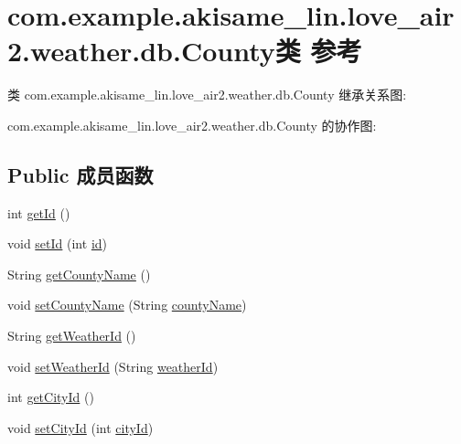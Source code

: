 \hypertarget{classcom_1_1example_1_1akisame__lin_1_1love__air2_1_1weather_1_1db_1_1_county}{}\section{com.\+example.\+akisame\+\_\+lin.\+love\+\_\+air2.\+weather.\+db.\+County类 参考}
\label{classcom_1_1example_1_1akisame__lin_1_1love__air2_1_1weather_1_1db_1_1_county}


类 com.\+example.\+akisame\+\_\+lin.\+love\+\_\+air2.\+weather.\+db.\+County 继承关系图\+:


com.\+example.\+akisame\+\_\+lin.\+love\+\_\+air2.\+weather.\+db.\+County 的协作图\+:
\subsection*{Public 成员函数}
\begin{DoxyCompactItemize}
\item 
int \mbox{\hyperlink{classcom_1_1example_1_1akisame__lin_1_1love__air2_1_1weather_1_1db_1_1_county_a3a5dbe427d3901aa5286de4df9147fb7}{get\+Id}} ()
\item 
void \mbox{\hyperlink{classcom_1_1example_1_1akisame__lin_1_1love__air2_1_1weather_1_1db_1_1_county_af07061de33945a1308ff6aa52243b244}{set\+Id}} (int \mbox{\hyperlink{classcom_1_1example_1_1akisame__lin_1_1love__air2_1_1weather_1_1db_1_1_county_a56ac4d6f64b542565100e138681c62d6}{id}})
\item 
String \mbox{\hyperlink{classcom_1_1example_1_1akisame__lin_1_1love__air2_1_1weather_1_1db_1_1_county_a6032aca0f273294dabfb63aa0c3ae18b}{get\+County\+Name}} ()
\item 
void \mbox{\hyperlink{classcom_1_1example_1_1akisame__lin_1_1love__air2_1_1weather_1_1db_1_1_county_a72c99a8667f59123abc68d021a0d991d}{set\+County\+Name}} (String \mbox{\hyperlink{classcom_1_1example_1_1akisame__lin_1_1love__air2_1_1weather_1_1db_1_1_county_abaca763825c2bc3d2c3302918902db9b}{county\+Name}})
\item 
String \mbox{\hyperlink{classcom_1_1example_1_1akisame__lin_1_1love__air2_1_1weather_1_1db_1_1_county_a7dc3f816523251642ffeb6bd0f77aa8a}{get\+Weather\+Id}} ()
\item 
void \mbox{\hyperlink{classcom_1_1example_1_1akisame__lin_1_1love__air2_1_1weather_1_1db_1_1_county_a8f7bc17f518be4d1c32794d4551547d9}{set\+Weather\+Id}} (String \mbox{\hyperlink{classcom_1_1example_1_1akisame__lin_1_1love__air2_1_1weather_1_1db_1_1_county_a11751ad0f8a6a16364a9ec74a3b7d926}{weather\+Id}})
\item 
int \mbox{\hyperlink{classcom_1_1example_1_1akisame__lin_1_1love__air2_1_1weather_1_1db_1_1_county_a6d74cfab6bc1e2b55d58b5f37b6b2903}{get\+City\+Id}} ()
\item 
void \mbox{\hyperlink{classcom_1_1example_1_1akisame__lin_1_1love__air2_1_1weather_1_1db_1_1_county_a2d6453cb8f333536c8d00a90832eb683}{set\+City\+Id}} (int \mbox{\hyperlink{classcom_1_1example_1_1akisame__lin_1_1love__air2_1_1weather_1_1db_1_1_county_ac8ba6886b8502d48b483673a6cd8805c}{city\+Id}})
\end{DoxyCompactItemize}
